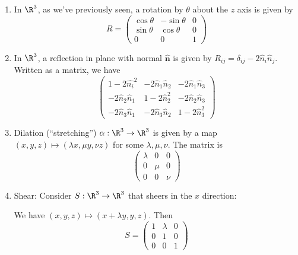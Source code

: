 \documentclass[a4paper]{article}
\begin{document}
\begin{enumerate}
  \item In $\R^3$, as we've previously seen, a rotation by $\theta$ about the $z$ axis is given by
    \[
      R = \begin{pmatrix}
        \cos\theta & -\sin\theta & 0 \\
        \sin\theta & \cos\theta & 0 \\
        0 & 0 & 1
      \end{pmatrix}
    \]
  \item In $\R^3$, a reflection in plane with normal $\hat{\mathbf{n}}$ is given by $R_{ij} = \delta_{ij} - 2\hat n_i\hat n_j$. Written as a matrix, we have
    \[
      \begin{pmatrix}
        1 - 2\hat{n_i}^2 & -2\hat n_1\hat n_2 & -2\hat n_1\hat n_3\\
        -2\hat n_2\hat n_1 & 1 - 2\hat n_2^2 & -2\hat n_2\hat n_3\\
        -2\hat n_3\hat n_1 & -2\hat n_3\hat n_2 & 1 - 2\hat n_3^2
      \end{pmatrix}
    \]
  \item Dilation (``stretching'') $\alpha: \R^3 \to \R^3$ is given by a map $(x, y, z)\mapsto (\lambda x, \mu y, \nu z)$ for some $\lambda, \mu, \nu$. The matrix is
    \[
      \begin{pmatrix}
        \lambda & 0 & 0\\
        0 & \mu & 0\\
        0 & 0 & \nu
      \end{pmatrix}
    \]
  \item Shear: Consider $S:\R^3 \to \R^3$ that sheers in the $x$ direction:
    \begin{center}
    \end{center}
    We have $(x, y, z)\mapsto (x + \lambda y, y, z)$. Then
    \[
      S =
      \begin{pmatrix}
        1 & \lambda & 0\\
        0 & 1 & 0\\
        0 & 0 & 1
      \end{pmatrix}
    \]
\end{enumerate}
\end{document}
